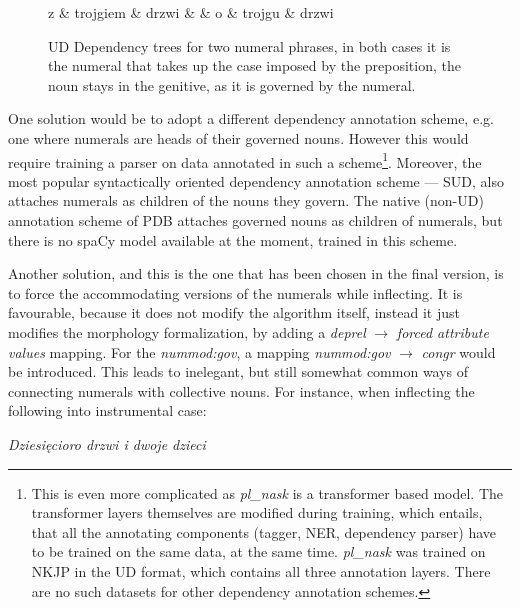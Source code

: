 \documentclass[12pt]{article}
\newcommand{\gloss}[1]{\vspace{10pt}\indent\textit{#1}\vspace{5pt}}
\begin{document}
\begin{figure}[H]
\centering
\begin{dependency}[edge slant=0]
\begin{deptext}[column sep=1cm]
z \& trojgiem \& drzwi \& \& o \& trojgu \& drzwi \\
\end{deptext}
\end{dependency}
\caption{UD Dependency trees for two numeral phrases, in both cases it is the numeral that takes up the case imposed by the preposition, the noun stays in the genitive, as it is governed by the numeral.} \label{tree:numerals}
\end{figure}

One solution would be to adopt a different dependency annotation scheme, e.g. one where numerals are heads of their governed nouns. However this would require training a parser on data annotated in such a scheme\footnote{This is even more complicated as \textit{pl\_nask} is a transformer based model. The transformer layers themselves are modified during training, which entails, that all the annotating components (tagger, NER, dependency parser) have to be trained on the same data, at the same time. \textit{pl\_nask} was trained on NKJP in the UD format, which contains all three annotation layers. There are no such datasets for other dependency annotation schemes.}. Moreover, the most popular syntactically oriented dependency annotation scheme --- SUD, also attaches numerals as children of the nouns they govern. The native (non-UD) annotation scheme of PDB attaches governed nouns as children of numerals, but there is no spaCy model available at the moment, trained in this scheme.

Another solution, and this is the one that has been chosen in the final version, is to force the accommodating versions of the numerals while inflecting. It is favourable, because it does not modify the algorithm itself, instead it just modifies the morphology formalization, by adding a \textit{deprel} $\rightarrow$ \textit{forced attribute values} mapping. For the \textit{nummod:gov}, a mapping \textit{nummod:gov} $\rightarrow$ \textit{congr} would be introduced. This leads to inelegant, but still somewhat common ways of connecting numerals with collective nouns. For instance, when inflecting the following into instrumental case:

\gloss{Dziesięcioro drzwi i dwoje dzieci}
\end{document}
